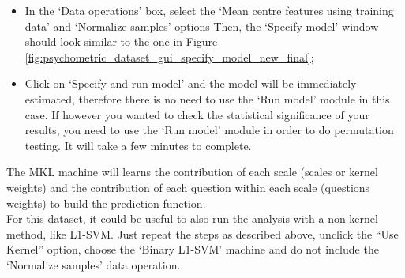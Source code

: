 \begin{itemize}
	\item In the `Data operations' box, select the `Mean centre features using training data' and `Normalize samples' options Then, the `Specify model' window should look similar to the one in Figure \ref{fig:psychometric_dataset_gui_specify_model_new_final};
	
	\item Click on `Specify and run model' and the model will be immediately estimated, therefore there is no need to use the `Run model' module in this case. If however you wanted to check the statistical significance of your results, you need to use the `Run model' module in order to do permutation testing. It will take a few minutes to complete.

\end{itemize}

The MKL machine will learns the contribution of each scale (scales or kernel weights) and the contribution of each question within each scale (questions weights) to build the prediction function.
\\

For this dataset, it could be useful to also run the analysis with a non-kernel method, like L1-SVM. Just repeat the steps as described above, unclick the “Use Kernel” option, choose the ‘Binary L1-SVM’ machine and do not include the ‘Normalize samples’ data operation.













